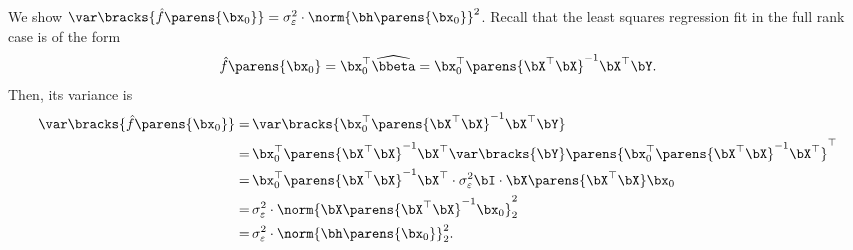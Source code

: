 \documentclass[12pt]{article}
\begin{document}
\begin{enumerate}[label=\textbf{\arabic*.}]
	We show $\var \bracks{\hat{f} \parens{\bx_0}} = \sigma_{\varepsilon}^2 \cdot \norm{\bh \parens{\bx_0}}^2$. Recall that the least squares regression fit in the full rank case is of the form 
	\begin{align*}
		\hat{f} \parens{\bx_0} = \bx_0^\top \widehat{\bbeta} = \bx_0^\top \parens{\bX^\top \bX}^{-1} \bX^\top \bY.  
	\end{align*}
	Then, its variance is
	\begin{align*}
		\var \bracks{\hat{f} \parens{\bx_0}} = & \, \var \bracks{ \bx_0^\top \parens{\bX^\top \bX}^{-1} \bX^\top \bY } \\ 
		= & \, \bx_0^\top \parens{\bX^\top \bX}^{-1} \bX^\top \var \bracks{\bY} \parens{\bx_0^\top \parens{\bX^\top \bX}^{-1}\bX^\top}^\top \\
		= & \, \bx_0^\top \parens{\bX^\top \bX}^{-1} \bX^\top \cdot \sigma_{\varepsilon}^2 \bI \cdot \bX \parens{\bX^\top \bX} \bx_0 \\
		= & \, \sigma_{\varepsilon}^2 \cdot \norm{ \bX \parens{\bX^\top \bX}^{-1} \bx_0}_2^2 \\ 
		= & \, \sigma_{\varepsilon}^2 \cdot \norm{\bh\parens{\bx_0}}_2^2. 
	\end{align*}
	

\end{enumerate}
\end{document}
